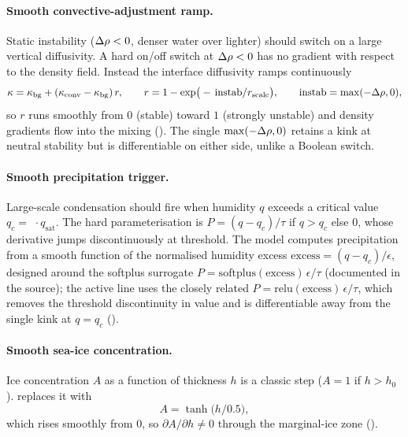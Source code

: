 \paragraph{Smooth convective-adjustment ramp.} Static instability ($\Delta\rho<0$, denser water over
lighter) should switch on a large vertical diffusivity. A hard on/off switch at $\Delta\rho<0$ has no
gradient with respect to the density field. Instead the interface diffusivity ramps continuously
\begin{equation}
  \kappa = \kappa_{\mathrm{bg}} + (\kappa_{\mathrm{conv}}-\kappa_{\mathrm{bg}})\,r,
  \qquad
  r = 1-\exp\!\big(-\,\mathrm{instab}/r_{\mathrm{scale}}\big),
  \qquad
  \mathrm{instab}=\max(-\Delta\rho,0),
  \label{eq:conv-ramp}
\end{equation}
so $r$ runs smoothly from $0$ (stable) toward $1$ (strongly unstable) and density gradients flow
into the mixing (). The single
$\max(-\Delta\rho,0)$ retains a kink at neutral stability but is differentiable on either side, unlike a
Boolean switch.

\paragraph{Smooth precipitation trigger.} Large-scale condensation should fire when humidity $q$
exceeds a critical value $q_c=\,$$\,\cdot q_{\mathrm{sat}}$. The hard parameterisation
is $P=(q-q_c)/\tau$ if $q>q_c$ else $0$, whose derivative jumps discontinuously at threshold. The
model computes precipitation from a smooth function of the normalised humidity excess
$\mathrm{excess}=(q-q_c)/\epsilon$, designed around the softplus surrogate
$P=\mathrm{softplus}(\mathrm{excess})\,\epsilon/\tau$ (documented in the source); the active line
uses the closely related $P=\mathrm{relu}(\mathrm{excess})\,\epsilon/\tau$, which removes the
threshold discontinuity in value and is differentiable away from the single kink at $q=q_c$
().

\paragraph{Smooth sea-ice concentration.} Ice concentration $A$ as a function of thickness $h$ is a
classic step ($A=1$ if $h>h_0$). \model{} replaces it with
\begin{equation}
  A = \tanh\!\big(h/0.5\big),
  \label{eq:ice-conc}
\end{equation}
which rises smoothly from $0$, so $\partial A/\partial h\neq 0$ through the marginal-ice zone
().

